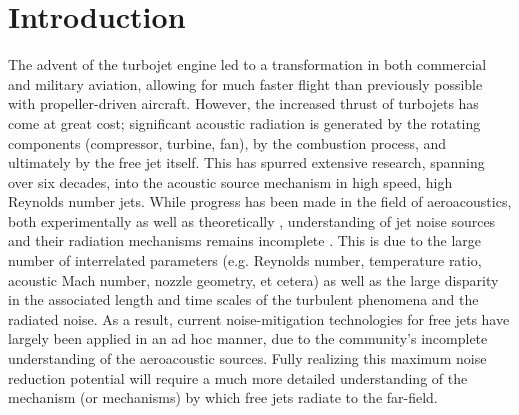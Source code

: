 \section{Introduction}
\label{introduction}
The advent of the turbojet engine led to a transformation in both commercial and military aviation, allowing for much faster flight than previously possible with propeller-driven aircraft. 
However, the increased thrust of turbojets has come at great cost; significant acoustic radiation is generated by the rotating components (compressor, turbine, fan), by the combustion process, and ultimately by the free jet itself. 
This has spurred extensive research, spanning over six decades, into the acoustic source mechanism in high speed, high Reynolds number jets. 
While progress has been made in the field of aeroacoustics, both experimentally \citep{Tam1996, Viswanathan2006, Tam2008} as well as theoretically \citep{Cabana2008}, understanding of jet noise sources and their radiation mechanisms remains incomplete \citep{Jordan2008}.
This is due to the large number of interrelated parameters (e.g. Reynolds number, temperature ratio, acoustic Mach number, nozzle geometry, et cetera) as well as the large disparity in the associated length and time scales of the turbulent phenomena and the radiated noise.
As a result, current noise-mitigation technologies for free jets have largely been applied in an ad
hoc manner, due to the community's incomplete understanding of the aeroacoustic sources.
Fully realizing this maximum noise reduction potential will require a much more detailed understanding of the mechanism (or mechanisms) by which free jets radiate to the far-field.

